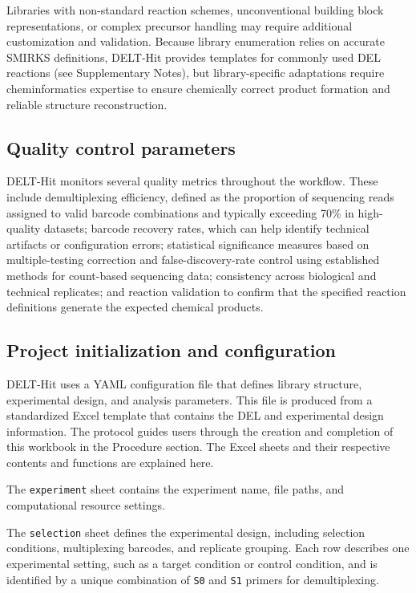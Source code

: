 Libraries with non-standard reaction schemes, unconventional building block representations, or complex precursor handling may require additional customization and validation. Because library enumeration relies on accurate SMIRKS definitions, DELT-Hit provides templates for commonly used DEL reactions (see Supplementary Notes), but library-specific adaptations require cheminformatics expertise to ensure chemically correct product formation and reliable structure reconstruction. 


\subsection{Quality control parameters}
DELT-Hit monitors several quality metrics throughout the workflow. These include demultiplexing efficiency, defined as the proportion of sequencing reads assigned to valid barcode combinations and typically exceeding 70\% in high-quality datasets; barcode recovery rates, which can help identify technical artifacts or configuration errors; statistical significance measures based on multiple-testing correction and false-discovery-rate control using established methods for count-based sequencing data; consistency across biological and technical replicates; and reaction validation to confirm that the specified reaction definitions generate the expected chemical products.


\subsection{Project initialization and configuration}

DELT-Hit uses a YAML configuration file that defines library structure, experimental design, and analysis parameters. This file is produced from a standardized Excel template that contains the DEL and experimental design information. The protocol guides users through the creation and completion of this workbook in the Procedure section. The Excel sheets and their respective contents and functions are explained here. 

The \texttt{experiment} sheet contains the experiment name, file paths, and computational resource settings. 

The \texttt{selection} sheet defines the experimental design, including selection conditions, multiplexing barcodes, and replicate grouping. Each row describes one experimental setting, such as a target condition or control condition, and is identified by a unique combination of \texttt{S0} and \texttt{S1} primers for demultiplexing. 

